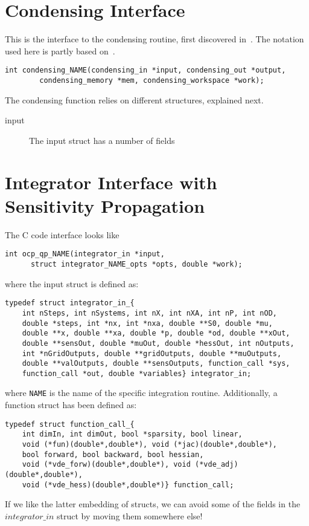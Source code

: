 \documentclass{report}
\begin{document}
\section{Condensing Interface}

This is the interface to the condensing routine, first discovered in~\cite{Bock1984}. The notation used here is partly based on~\cite{Frasch2014a}.

\begin{verbatim}
int condensing_NAME(condensing_in *input, condensing_out *output,
        condensing_memory *mem, condensing_workspace *work);
\end{verbatim}

The condensing function relies on different structures, explained next.

\begin{description}
	\item[input] The input struct has a number of fields
\end{description}

\section{Integrator Interface with Sensitivity Propagation}

The C code interface looks like
\begin{verbatim}
int ocp_qp_NAME(integrator_in *input, 
      struct integrator_NAME_opts *opts, double *work);
\end{verbatim}
where the input struct is defined as:
\begin{verbatim}
typedef struct integrator_in_{
    int nSteps, int nSystems, int nX, int nXA, int nP, int nOD, 
    double *steps, int *nx, int *nxa, double **S0, double *mu,
    double **x, double **xa, double *p, double *od, double **xOut, 
    double **sensOut, double *muOut, double *hessOut, int nOutputs,
    int *nGridOutputs, double **gridOutputs, double **muOutputs, 
    double **valOutputs, double **sensOutputs, function_call *sys, 
    function_call *out, double *variables} integrator_in;
\end{verbatim}
where {\tt NAME} is the name of the specific integration routine. Additionally, a function struct has been defined as:
\begin{verbatim}
typedef struct function_call_{
    int dimIn, int dimOut, bool *sparsity, bool linear, 
    void (*fun)(double*,double*), void (*jac)(double*,double*), 
    bool forward, bool backward, bool hessian,
    void (*vde_forw)(double*,double*), void (*vde_adj)(double*,double*),
    void (*vde_hess)(double*,double*)} function_call;
\end{verbatim}
If we like the latter embedding of structs, we can avoid some of the fields in the $integrator\_in$ struct by moving them somewhere else!
\end{document}
